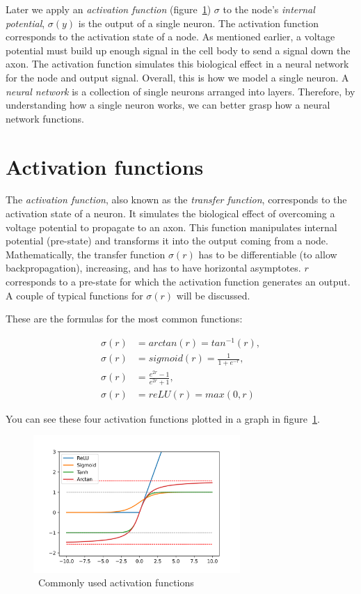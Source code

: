 Later we apply an \textit{activation function} (figure~\ref{fig:activation-functions}) $\sigma$ to the node’s \textit{internal potential}, $\sigma (y)$ is the output of a single neuron.
The activation function corresponds to the activation state of a node.
As mentioned earlier, a voltage potential must build up enough signal in the cell body to send a signal down the axon.
The activation function simulates this biological effect in a neural network for the node and output signal.
Overall, this is how we model a single neuron.
A \textit{neural network} is a collection of single neurons arranged into layers.
Therefore, by understanding how a single neuron works, we can better grasp how a neural network functions.~\cite{ann-basics}


\section{Activation functions}\label{sec:activation-functions}

The \textit{activation function}, also known as the \textit{transfer function}, corresponds to the activation state of a neuron.
It simulates the biological effect of overcoming a voltage potential to propagate to an axon.
This function manipulates internal potential (pre-state) and transforms it into the output coming from a node.
Mathematically, the transfer function $\sigma (r)$ has to be differentiable (to allow backpropagation), increasing, and has to have horizontal asymptotes.
$r$ corresponds to a pre-state for which the activation function generates an output.
A couple of typical functions for $\sigma (r)$ will be discussed.~\cite{ann-basics}

These are the formulas for the most common functions:

\begin{align*}
    \sigma (r) &= arctan(r) = tan^{-1}(r), \\[4pt]
    \sigma (r) &= sigmoid(r) = \frac{1}{1 + e^{-r}}, \\[4pt]
    \sigma (r) &= \frac{e^{2r} - 1}{e^{2r} + 1}, \\[4pt]
    \sigma (r) &= reLU(r) = max(0, r)
\end{align*}

You can see these four activation functions plotted in a graph in figure~\ref{fig:activation-functions}.

\begin{figure}
    \centering
    \includegraphics[width=0.7\textwidth]{assets/activation-functions}
    \caption{~Commonly used activation functions}\label{fig:activation-functions}
\end{figure}


